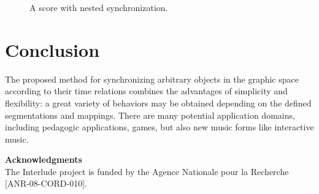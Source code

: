 \documentclass[twoside,10pt]{article}
\begin{document}
\begin{figure}[htbp]
\centerline{}
\caption{A score with nested synchronization.}
\label{fig:scene}
\end{figure}

\section{Conclusion}

The proposed method for synchronizing arbitrary objects in the graphic space according to their time relations combines the advantages of simplicity and flexibility: a great variety of behaviors may be obtained depending on the defined segmentations and mappings. There are many potential application domains, including pedagogic applications, games, but also new music forms like interactive music.

\vspace{4mm}
\hspace{-6mm}
\textbf{Acknowledgments} \\
The Interlude project is funded by the Agence Nationale pour la Recherche [ANR-08-CORD-010].




\end{document}
